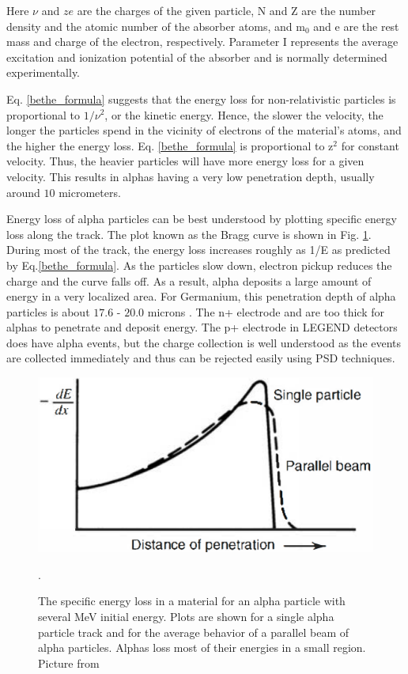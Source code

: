 Here $\nu$ and $ze$ are the charges of the given particle, N and Z are the number density and the atomic number of the absorber atoms, and  m$_0$ and e are the rest mass and charge of the electron, respectively. Parameter I represents the average excitation and ionization potential of the absorber and is normally determined experimentally. 

Eq. \ref{bethe_formula} suggests that the energy loss for non-relativistic particles is proportional to $1/\nu^2$, or the kinetic energy. Hence, the slower the velocity, the longer the particles spend in the vicinity of electrons of the material's atoms, and the higher the energy loss. Eq. \ref{bethe_formula} is proportional to z$^2$ for constant velocity. Thus, the heavier particles will have more energy loss for a given velocity. This results in alphas having a very low penetration depth, usually around $10$ micrometers.

Energy loss of alpha particles can be best understood by plotting specific energy loss along the track. The plot known as the Bragg curve is shown in Fig. \ref{bragg_curve_fig}. During most of the track, the energy loss increases roughly as 1/E as predicted by Eq.\ref{bethe_formula}. As the particles slow down, electron pickup reduces the charge and the curve falls off. As a result, alpha deposits a large amount of energy in a very localized area. For Germanium, this penetration depth of alpha particles is about $17.6$ - $20.0$ microns \cite{knoll_2010}. The n+ electrode and  are too thick for alphas to penetrate and deposit energy. The p+ electrode in LEGEND detectors does have alpha events, but the charge collection is well understood as the events are collected immediately and thus can be rejected easily using PSD techniques. 

\begin{figure}
\centering
\includegraphics[width=0.5\linewidth]{ch3/figs/bragg_curve.png}
\caption{The specific energy loss in a material for an alpha particle with several MeV initial energy. Plots are shown for a single alpha particle track and for the average behavior of a parallel beam of alpha particles. Alphas loss most of their energies in a small region. Picture from \cite{knoll_2010}}. 
\label{bragg_curve_fig}
\end{figure}

